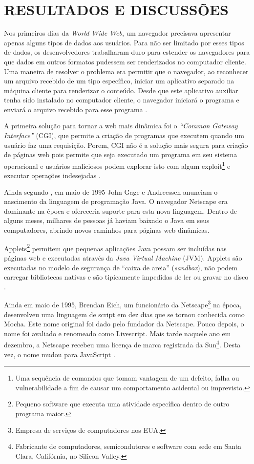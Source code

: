 \section{RESULTADOS E DISCUSSÕES}

Nos primeiros dias da \emph{World Wide Web}, um navegador precisava apresentar apenas alguns tipos de dados aos usuários. Para não ser limitado por esses tipos de dados, os desenvolvedores trabalharam duro para estender os navegadores para que dados em outros formatos pudessem ser renderizados no computador cliente. Uma maneira de resolver o problema era permitir que o navegador, ao reconhecer um arquivo recebido de um tipo específico, iniciar um aplicativo separado na máquina cliente para renderizar o conteúdo. Desde que este aplicativo auxiliar tenha sido instalado no computador cliente, o navegador iniciará o programa e enviará o arquivo recebido para esse programa \cite{zammetti2007brief}.

A primeira solução para tornar a web mais dinâmica foi o \emph{“Common Gateway Interface”} (CGI), que permite a criação de programas que executem quando um usuário faz uma requisição. Porem, CGI não é a solução mais segura para criação de páginas web pois permite que seja executado um programa em seu sistema operacional e usuários maliciosos podem explorar isto com algum exploit\footnote{Uma sequência de comandos que tomam vantagem de um defeito, falha ou vulnerabilidade a fim de causar um comportamento acidental ou imprevisto.} e executar operações indesejadas \cite{Asleson2006}.

Ainda segundo , em maio de 1995 John Gage e Andreessen anunciam o nascimento da linguagem de programação Java. O navegador Netscape era dominante na época e ofereceria suporte para esta nova linguagem. Dentro de alguns meses, milhares de pessoas já haviam baixado o Java em seus computadores, abrindo novos caminhos para páginas web dinâmicas.

Applets\footnote{Pequeno software que executa uma atividade específica dentro de outro programa maior.} permitem que pequenas aplicações Java possam ser incluídas nas páginas web e executadas através da \emph{Java Virtual Machine} (JVM). Applets são executadas no modelo de segurança de “caixa de areia” (\emph{sandbox}), não podem carregar bibliotecas nativas e são tipicamente impedidas de ler ou gravar no disco \cite{Asleson2006}.

Ainda em maio de 1995, Brendan Eich, um funcionário da Netscape\footnote{Empresa de serviços de computadores nos EUA.} na época, desenvolveu uma linguagem de script em dez dias que se tornou conhecida como Mocha. Este nome original foi dado pelo fundador da Netscape. Pouco depois, o nome foi avaliado e renomeado como Livescript. Mais tarde naquele ano em dezembro, a Netscape recebeu uma licença de marca registrada da Sun\footnote{Fabricante de computadores, semicondutores e software com sede em Santa Clara, Califórnia, no Silicon Valley.}. Desta vez, o nome mudou para JavaScript \cite{neer2013history}.

